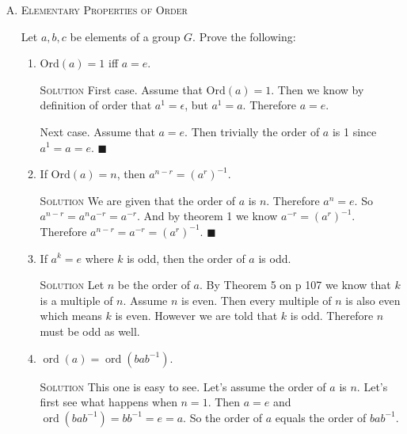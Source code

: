 \documentclass[twoside]{amsart}
\newcommand{\Integers}{\ensuremath{\mathbb{Z}{}}\xspace}
\newcommand{\solution}{\textsc{Solution}\xspace}
\newcommand{\blank}{\vspace{5pt}}
\renewcommand{\qed}{\blacksquare}
\newcommand{\itm}{\blank\item}
\newcommand{\sol}{\blank\noindent\solution}
\newcommand{\ord}{\mathop{\mathrm{ord}}}
\begin{document}
\begin{enumerate}[A.]
\begin{enumerate}[1]
      Fortunately $A$ does not include $0, 1, 2$ as each of those 
      is not defined for one of the powers of $f$. We can
      see that the order of $f$ is 4.

      \itm Can as element of an \emph{infinite} group have 
      \emph{finite} order? Explain.

      \sol Obviously yes it can. The identity element of an infinite
      group is the trivial example. But the previous problem is also
      an example. $S_A$ in the previous problem is an infinte
      set, yet $f$ has finite order.

      \itm In $\Integers_{24}$, list all the elements $(a)$ of order 2;
      $(b)$ of order 3; $(c)$ of order 4; $(d)$ of order 6.

      \sol $(a)$: 12; $(b)$ 8, 16; $(c)$ 6, 18; $(d)$ 4, 20
   \end{enumerate}

   \itm \textsc{Elementary Properties of Order}
   
   \noindent Let $a, b, c$ be elements of a group $G$. Prove the following:

   \begin{enumerate}[1]
      \itm $\mathrm{Ord}(a) = 1$ iff $a=e$.

      \sol First case. Assume that $\mathrm{Ord}(a) = 1$. Then we know by
      definition of order that $a^1 = \epsilon$, but $a^1=a$. Therefore $a=e$.

      Next case. Assume that $a=e$. Then trivially the order of $a$
      is 1 since $a^1=a=e$. $\qed$

      \itm If $\mathrm{Ord}(a)=n$, then $a^{n-r} = (a^r)^{-1}$.

      \sol We are given that the order of $a$ is $n$. Therefore
      $a^n = e$. So $a^{n-r} = a^n a^{-r} = a^{-r}$. And by theorem
      1 we know $a^{-r}=(a^r)^{-1}$. Therefore $a^{n-r} = a^{-r} =
      (a^r)^{-1}$. $\qed$

      \itm If $a^k=e$ where $k$ is odd, then the order of $a$ is odd.
      
      \sol Let $n$ be the order of $a$. By Theorem 5 on p 107 we know that
      $k$ is a multiple of $n$. Assume $n$ is even. Then every multiple of
      $n$ is also even which means $k$ is even. However we are told that
      $k$ is odd. Therefore $n$ must be odd as well.

      \itm $\ord(a) = \ord(bab^{-1})$.

      \sol This one is easy to see. Let's assume the order of $a$
      is $n$. Let's first see what happens when $n=1$. Then
      $a=e$ and $\ord(bab^{-1}) = bb^{-1} = e = a$. So the order of
      $a$ equals the order of $bab^{-1}$.


\end{enumerate}
\end{enumerate}
\end{document}
